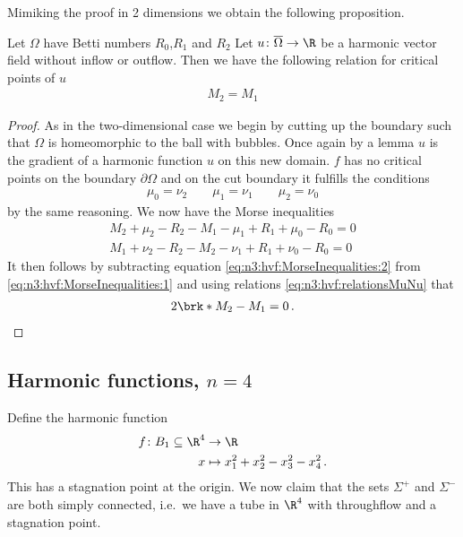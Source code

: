 Mimiking the proof in 2 dimensions we obtain the following proposition.
\begin{proposition}
  Let $\Omega$ have Betti numbers $R_0$,$R_1$ and $R_2$
  Let $u\colon\overline{\Omega}\to\R$ be a harmonic vector field without inflow or outflow. Then we have the following relation for
  critical points of $u$
  \begin{align*}
    M_2=M_1
  \end{align*}
\end{proposition}
\begin{proof}
  As in the two-dimensional case we begin by cutting up the boundary such that $\Omega$ is homeomorphic to the ball with bubbles.
  Once again by a lemma  $u$ is the gradient of a harmonic function $u$ on this new domain.
  $f$ has no critical points on the boundary $\partial\Omega$ and on the cut boundary it fulfills the conditions
  \begin{align}
    \mu_0=\nu_2\qquad \mu_1=\nu_1 \qquad \mu_2=\nu_0 \label{eq:n3:hvf:relationsMuNu}
  \end{align}
  by the same reasoning. We now have the Morse inequalities
  \begin{align}
    M_2+\mu_2-R_2-M_1-\mu_1+R_1+\mu_0-R_0=0 \label{eq:n3:hvf:MorseInequalities:1} \\
    M_1+\nu_2-R_2-M_2-\nu_1+R_1+\nu_0-R_0=0 \label{eq:n3:hvf:MorseInequalities:2}
  \end{align}
  It then follows by subtracting equation \eqref{eq:n3:hvf:MorseInequalities:2} from \eqref{eq:n3:hvf:MorseInequalities:1}
  and using relations \eqref{eq:n3:hvf:relationsMuNu} that
  \begin{align*}
    2\brk*{M_2-M_1}=0\,.
  \end{align*}
\end{proof}

\newpage

\subsection{Harmonic functions, $n=4$} 
Define the harmonic function 
\begin{align*}
  f\colon B_1\subseteq\R^4&\to \R \\
  x &\mapsto x_1^2+x_2^2-x_3^2-x_4^2\,.
\end{align*}
This has a stagnation point at the origin. We now claim that the sets $\Sigma^+$ and $\Sigma^-$ are both simply connected, i.e.\
we have a tube in $\R^4$ with throughflow and a stagnation point.

